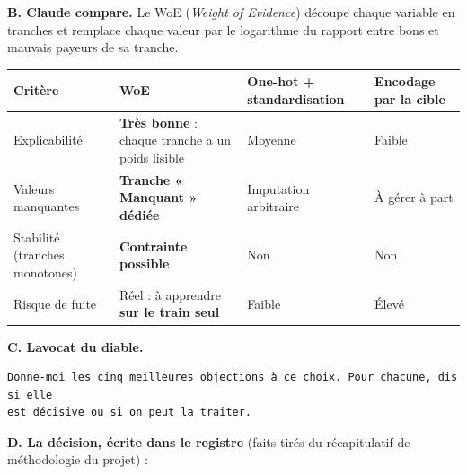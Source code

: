 \documentclass[
  french,
  11pt,
  a4paper,
]{article}
\begin{document}
\textbf{B. Claude compare.} Le WoE (\emph{Weight of Evidence}) découpe
chaque variable en tranches et remplace chaque valeur par le logarithme
du rapport entre bons et mauvais payeurs de sa tranche.

\begin{longtable}[]{@{}
  >{\raggedright\arraybackslash}p{}
  >{\raggedright\arraybackslash}p{}
  >{\raggedright\arraybackslash}p{}
  >{\raggedright\arraybackslash}p{}@{}}
\toprule\noalign{}
\begin{minipage}[b]{\linewidth}\raggedright
Critère
\end{minipage} & \begin{minipage}[b]{\linewidth}\raggedright
WoE
\end{minipage} & \begin{minipage}[b]{\linewidth}\raggedright
One-hot + standardisation
\end{minipage} & \begin{minipage}[b]{\linewidth}\raggedright
Encodage par la cible
\end{minipage} \\
\midrule\noalign{}
\endhead
\bottomrule\noalign{}
\endlastfoot
Explicabilité & \textbf{Très bonne} : chaque tranche a un poids lisible
& Moyenne & Faible \\
Valeurs manquantes & \textbf{Tranche « Manquant » dédiée} & Imputation
arbitraire & À gérer à part \\
Stabilité (tranches monotones) & \textbf{Contrainte possible} & Non &
Non \\
Risque de fuite & Réel : à apprendre \textbf{sur le train seul} & Faible
& Élevé \\
\end{longtable}

\textbf{C. L\textquotesingle avocat du diable.}

\begin{Verbatim}[breaklines=true,breakanywhere=true,fontsize=\small,frame=leftline,framerule=1.6pt,rulecolor=\color{credixblue},framesep=3mm,xleftmargin=2mm,xrightmargin=1mm]
Donne-moi les cinq meilleures objections à ce choix. Pour chacune, dis si elle
est décisive ou si on peut la traiter.
\end{Verbatim}

\textbf{D. La décision, écrite dans le registre} (faits tirés du
récapitulatif de méthodologie du projet) :
\end{document}
